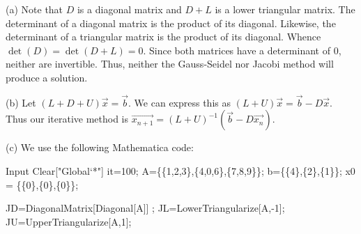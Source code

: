 \documentclass[10pt,twoside,openany]{memoir}
\begin{document}
        \begin{mdframed}
        \begin{solution}
            (a) Note that $D$ is a diagonal matrix and $D + L$ is a lower triangular matrix. The determinant of a diagonal matrix is the product of its diagonal. Likewise, the determinant of a triangular matrix is the product of its diagonal. Whence $\det(D) = \det(D + L) = 0$. Since both matrices have a determinant of 0, neither are invertible. Thus, neither the Gauss-Seidel nor Jacobi method will produce a solution. \nl
            
            \noindent (b) Let $(L+D+U)\vec{x} = \vec{b}$. We can express this as $(L+U)\vec{x} = \vec{b} - D\vec{x}$. Thus our iterative method is $\overrightarrow{x_{n+1}} = (L+U)^{-1} \left( \vec{b} - D\vec{x_n} \right)$. \nl
            
            \noindent \newpage(c) We use the following Mathematica code:

\begin{mmaCell}[moredefined={it, A, b, x0, JD, JL, JU, x, n, xLastit, \
    table, CellToTeX},morepattern={cell}]{Input}
Clear["Global`*"]
it=100;
A=\{\{1,2,3\},\{4,0,6\},\{7,8,9\}\};
b=\{\{4\},\{2\},\{1\}\};
x0 = \{\{0\},\{0\},\{0\}\};

JD=DiagonalMatrix[Diagonal[A]] ;
JL=LowerTriangularize[A,-1];
JU=UpperTriangularize[A,1];


\end{mmaCell}
\end{solution}
\end{mdframed}
\end{document}
